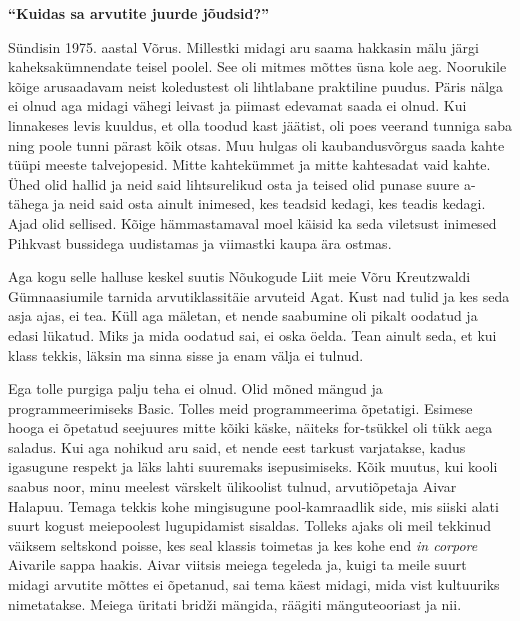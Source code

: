 
\textbf{\enquote{Kuidas sa arvutite juurde jõudsid?}}

Sündisin 1975. aastal Võrus. Millestki midagi aru saama hakkasin mälu järgi kaheksakümnendate teisel poolel. See oli mitmes mõttes üsna kole aeg. Noorukile kõige arusaadavam neist koledustest oli lihtlabane praktiline puudus. Päris nälga ei olnud aga midagi vähegi leivast ja piimast edevamat saada ei olnud. Kui linnakeses levis kuuldus, et olla toodud kast jäätist, oli poes veerand tunniga saba ning poole tunni pärast kõik otsas. Muu hulgas oli kaubandusvõrgus saada kahte tüüpi meeste talvejopesid. Mitte kahtekümmet ja mitte kahtesadat vaid kahte. Ühed olid hallid ja neid said lihtsurelikud osta ja teised olid punase suure a-tähega ja neid said osta ainult inimesed, kes teadsid kedagi, kes teadis kedagi. Ajad olid sellised. Kõige hämmastamaval moel käisid ka seda viletsust inimesed Pihkvast bussidega uudistamas ja viimastki kaupa ära ostmas. 

Aga kogu selle halluse keskel suutis Nõukogude Liit meie Võru Kreutzwaldi Gümnaasiumile tarnida arvutiklassitäie arvuteid Agat. Kust nad tulid ja kes seda asja ajas, ei tea. Küll aga mäletan, et nende saabumine oli pikalt oodatud ja edasi lükatud. Miks ja mida oodatud sai, ei oska öelda. Tean ainult seda, et kui klass tekkis, läksin ma sinna sisse ja enam välja ei tulnud. 

Ega tolle purgiga palju teha ei olnud. Olid mõned mängud ja programmeerimiseks Basic. Tolles meid programmeerima õpetatigi. Esimese hooga ei õpetatud seejuures mitte kõiki käske, näiteks for-tsükkel oli tükk aega saladus. Kui aga nohikud aru said, et nende eest tarkust varjatakse, kadus igasugune respekt ja läks lahti suuremaks isepusimiseks. Kõik muutus, kui kooli saabus noor, minu meelest värskelt ülikoolist tulnud, arvutiõpetaja Aivar Halapuu. Temaga tekkis kohe mingisugune pool-kamraadlik side, mis siiski alati suurt kogust meiepoolest lugupidamist sisaldas. Tolleks ajaks oli meil tekkinud väiksem seltskond poisse, kes seal klassis toimetas ja kes kohe end \emph{in corpore} Aivarile sappa haakis. Aivar viitsis meiega tegeleda ja, kuigi ta meile suurt midagi arvutite mõttes ei õpetanud, sai tema käest midagi, mida vist kultuuriks nimetatakse. Meiega üritati bridži mängida, räägiti mänguteooriast ja nii. 

